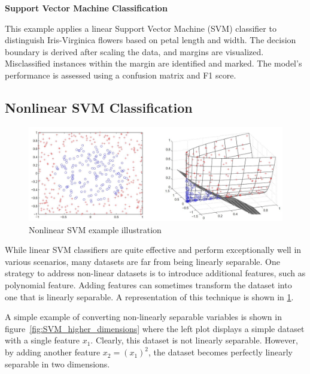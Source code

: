 \documentclass[12pt,letter]{article}
\begin{document}
\begin{example}
\textbf{Support Vector Machine Classification}

This example applies a linear Support Vector Machine (SVM) classifier to distinguish Iris-Virginica flowers based on petal length and width. The decision boundary is derived after scaling the data, and margins are visualized. Misclassified instances within the margin are identified and marked. The model's performance is assessed using a confusion matrix and F1 score.
\end{example}

\pagebreak
\subsection{Nonlinear SVM Classification}

\begin{figure}[H]
	\centering
	\includegraphics[width=6.5in]{../figures/nonlinear_SVM_example_illustration}
	\caption{Nonlinear SVM example illustration \protect\footnotemark[1]}
	\label{fig:nonlinear_SVM_example_illustration}
\end{figure}

While linear SVM classifiers are quite effective and perform exceptionally well in various scenarios, many datasets are far from being linearly separable. One strategy to address non-linear datasets is to introduce additional features, such as polynomial feature. Adding features can sometimes transform the dataset into one that is linearly separable. A representation of this technique is shown in \ref{fig:nonlinear_SVM_example_illustration}.

A simple example of converting non-linearly separable variables is shown in figure~\ref{fig:SVM_higher_dimensions} where the left plot displays a simple dataset with a single feature $x_1$. Clearly, this dataset is not linearly separable. However, by adding another feature $x_2 = (x_1)^2$, the dataset becomes perfectly linearly separable in two dimensions.
\end{document}
